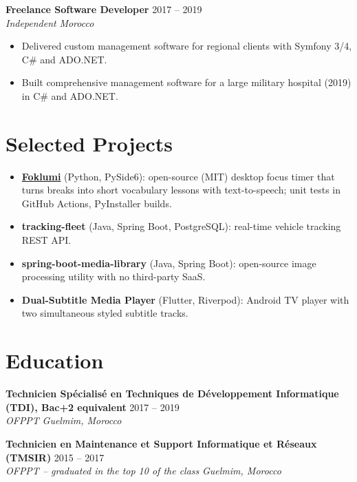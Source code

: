\documentclass[10pt,a4paper]{article}
\newcommand{\entry}[4]{%
  \textbf{#1} \hfill #2\\
  \textit{#3} \hfill \textit{#4}\par\vspace{1pt}}
\begin{document}
\entry{Freelance Software Developer}{2017 -- 2019}{Independent}{Morocco}
\begin{itemize}
  \item Delivered custom management software for regional clients with Symfony 3/4, C\# and ADO.NET.
  \item Built comprehensive management software for a large military hospital (2019) in C\# and ADO.NET.
\end{itemize}

\section{Selected Projects}
\begin{itemize}
  \item \textbf{\href{https://github.com/benodeveloper/foklumi}{Foklumi}} (Python, PySide6): open-source (MIT) desktop focus timer
        that turns breaks into short vocabulary lessons with text-to-speech; unit tests in GitHub Actions, PyInstaller builds.
  \item \textbf{tracking-fleet} (Java, Spring Boot, PostgreSQL): real-time vehicle tracking REST API.
  \item \textbf{spring-boot-media-library} (Java, Spring Boot): open-source image processing utility with no third-party SaaS.
  \item \textbf{Dual-Subtitle Media Player} (Flutter, Riverpod): Android TV player with two simultaneous styled subtitle tracks.
\end{itemize}

\section{Education}
\entry{Technicien Spécialisé en Techniques de Développement Informatique (TDI), Bac+2 equivalent}{2017 -- 2019}{OFPPT}{Guelmim, Morocco}
\vspace{3pt}
\entry{Technicien en Maintenance et Support Informatique et Réseaux (TMSIR)}{2015 -- 2017}{OFPPT -- graduated in the top 10 of the class}{Guelmim, Morocco}
\end{document}

